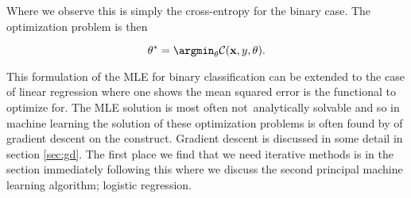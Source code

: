 \noindent Where we observe this is simply the cross-entropy for the binary case. The optimization problem is then 

\begin{equation}
\theta^* = \argmin_\theta \mathcal{C}(\mathbf{x}, y, \theta ).
\end{equation}

\noindent This formulation of the MLE for binary classification can be extended to the case of linear regression where one shows the mean squared error is the functional to optimize for. The MLE solution is most often not analytically solvable and so in machine learning the solution of these optimization problems is often found by of gradient descent on the construct. Gradient descent is discussed in some detail in section \ref{sec:gd}. The first place we find that we need iterative methods is in the section immediately following this where we discuss the second principal machine learning algorithm; logistic regression.

